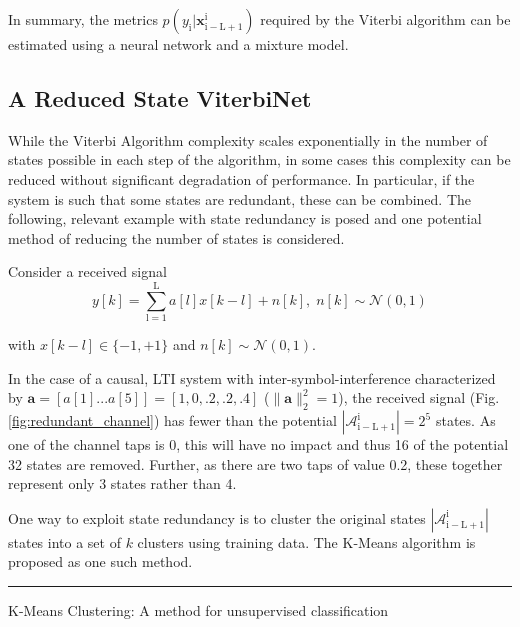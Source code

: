 \documentclass[12pt,a4paper]{article}
\begin{document}
In summary, the metrics $p(y_{\mathrm{i}}|\mathbf{x}_{\mathrm{i-L+1}}^{\mathrm{i}})$ required by the Viterbi algorithm can be estimated using a neural network and a mixture model.





\subsection{A Reduced State ViterbiNet}
While the Viterbi Algorithm complexity scales exponentially in the number of states possible in each step of the algorithm, in some cases this complexity can be reduced without significant degradation of performance. In particular, if the system is such that some states are redundant, these can be combined. The following, relevant example with state redundancy is posed and one potential method of reducing the number of states is considered. 

Consider a received signal
\begin{equation}
y[k] = \sum_{\mathrm{l=1}}^{\mathrm{L}} a[l]x[k-l] + n[k], \; n[k]  \sim \mathcal{N}(0,1)
\end{equation}

with $x[k-l] \in \{ -1, +1\}$ and $n[k]  \sim \mathcal{N}(0,1)$.  

In the case of a causal, LTI system with inter-symbol-interference characterized by $\mathbf{a} = [a[1]...a[5]]=[1, 0, .2, .2, .4]$ ($\|\mathbf{a}\|^2_2 = 1$), the received signal (Fig.\ref{fig:redundant_channel}) has fewer than the potential $|\mathcal{A}_{\mathrm{i-L+1}}^{\mathrm{i}}| =2^5$ states. As one of the channel taps is 0, this will have no impact and thus 16 of the potential 32 states are removed. Further, as there are two taps of value 0.2, these together represent only 3 states rather than 4. 


One way to exploit state redundancy is to cluster the original states $|\mathcal{A}_{\mathrm{i-L+1}}^{\mathrm{i}}|$  states into a set of $k$ clusters using training data. The K-Means algorithm is proposed as one such method.
\\

    \noindent\rule[16pt]{\textwidth}{0.6pt}
K-Means Clustering: A method for unsupervised classification
\end{document}
